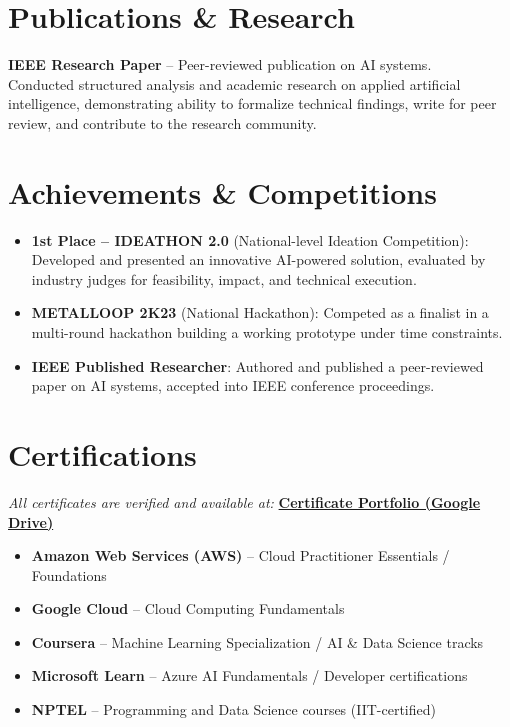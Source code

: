 \documentclass[11pt]{article}
\begin{document}
\section*{Publications \& Research}
\textbf{IEEE Research Paper} -- Peer-reviewed publication on AI systems. \\
Conducted structured analysis and academic research on applied artificial intelligence, demonstrating ability to formalize technical findings, write for peer review, and contribute to the research community.

\section*{Achievements \& Competitions}
\begin{itemize}
\item \textbf{1st Place -- IDEATHON 2.0} (National-level Ideation Competition): Developed and presented an innovative AI-powered solution, evaluated by industry judges for feasibility, impact, and technical execution.
\item \textbf{METALLOOP 2K23} (National Hackathon): Competed as a finalist in a multi-round hackathon building a working prototype under time constraints.
\item \textbf{IEEE Published Researcher}: Authored and published a peer-reviewed paper on AI systems, accepted into IEEE conference proceedings.
\end{itemize}

\section*{Certifications}
\textit{All certificates are verified and available at:} \href{https://drive.google.com/drive/folders/1ZQd-DeX-rXlEVDTwDJfjLjnG7iPc_fEw}{\textbf{Certificate Portfolio (Google Drive)}}

\begin{itemize}
\item \textbf{Amazon Web Services (AWS)} -- Cloud Practitioner Essentials / Foundations
\item \textbf{Google Cloud} -- Cloud Computing Fundamentals
\item \textbf{Coursera} -- Machine Learning Specialization / AI \& Data Science tracks
\item \textbf{Microsoft Learn} -- Azure AI Fundamentals / Developer certifications
\item \textbf{NPTEL} -- Programming and Data Science courses (IIT-certified)
\end{itemize}
\end{document}
